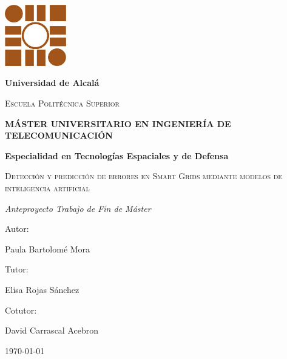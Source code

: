 \begin{titlepage}
\centering
{\includegraphics[width=0.2\textwidth]{./img/logo}\par}
\vspace{0.5cm}
{\bfseries\LARGE Universidad de Alcalá  \par}
\vspace{0.4cm}
{\scshape\Large Escuela Politécnica Superior \par}
\vspace{1.2cm}
{\bfseries\Large MÁSTER UNIVERSITARIO EN INGENIERÍA DE  TELECOMUNICACIÓN  \par}
\vspace{0.3cm}
{\bfseries\Large Especialidad en Tecnologías Espaciales y de Defensa  \par}
\vspace{2.1cm}
{\scshape\Huge Detección y predicción de errores en Smart Grids mediante modelos de inteligencia artificial\par}
\vspace{1.5cm}
{\itshape\Large Anteproyecto Trabajo de Fin de Máster \par}
\vfill
{\Large Autor: \par}
{\Large Paula Bartolomé Mora \par}
\vfill
{\Large Tutor: \par}
{\Large Elisa Rojas Sánchez \par}
\vfill
{\Large Cotutor: \par}
{\Large David Carrascal Acebron \par}
\vfill
{\Large \today \par}
\end{titlepage}